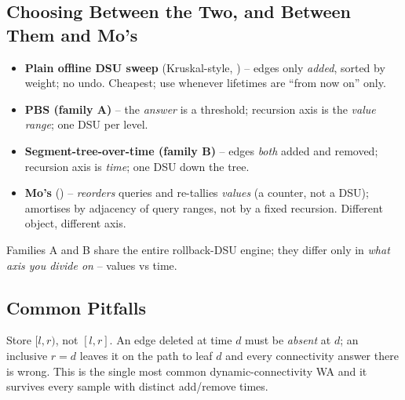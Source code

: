 \subsection{Choosing Between the Two, and Between Them and Mo's}

\begin{comparisonbox}
\begin{itemize}[nosep,leftmargin=1.4em]
  \item \textbf{Plain offline DSU sweep} (Kruskal-style, ) -- edges
        only \emph{added}, sorted by weight; no undo.  Cheapest; use whenever
        lifetimes are ``from now on'' only.
  \item \textbf{PBS (family A)} -- the \emph{answer} is a threshold; recursion
        axis is the \emph{value range}; one DSU per level.
  \item \textbf{Segment-tree-over-time (family B)} -- edges \emph{both} added and
        removed; recursion axis is \emph{time}; one DSU down the tree.
  \item \textbf{Mo's} () -- \emph{reorders} queries and re-tallies
        \emph{values} (a counter, not a DSU); amortises by adjacency of query
        ranges, not by a fixed recursion.  Different object, different axis.
\end{itemize}
Families A and B share the entire rollback-DSU engine; they differ only in
\emph{what axis you divide on} -- values vs time.
\end{comparisonbox}

\subsection{Common Pitfalls}

\begin{warningbox}
Store \([l,r)\), not \([l,r]\).  An edge deleted at time \(d\) must be
\emph{absent} at \(d\); an inclusive \(r=d\) leaves it on the path to leaf \(d\)
and every connectivity answer there is wrong.  This is the single most common
dynamic-connectivity WA and it survives every sample with distinct
add/remove times.
\end{warningbox}


